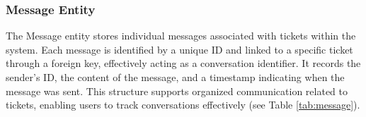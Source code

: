 %		
%		
%		
%		
%		
%	
	
	
	
	\subsubsection{Message Entity}
	The Message entity stores individual messages associated with tickets within the system. Each message is identified by a unique ID and linked to a specific ticket through a foreign key, effectively acting as a conversation identifier. It records the sender's ID, the content of the message, and a timestamp indicating when the message was sent. This structure supports organized communication related to tickets, enabling users to track conversations effectively (see Table \ref{tab:message}).
	
